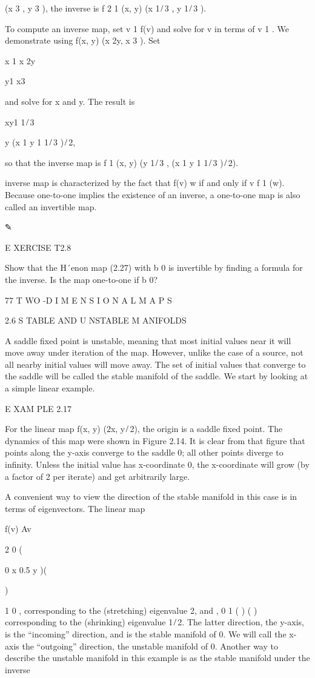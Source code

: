 \documentclass[12pt]{article}
\begin{document}
(x 3 , y 3 ), the inverse is f 2 1 (x, y)  (x 1 ̸ 3 , y 1 ̸ 3 ).

To compute an inverse map, set v 1  f(v) and solve for v in terms of v 1 . We demonstrate using f(x, y)  (x  2y, x 3 ). Set

x 1  x  2y

y1 x3 

and solve for x and y. The result is

xy1 1 ̸ 3 

y  (x 1  y 1 1 ̸ 3 ) ̸ 2,

so that the inverse map is f 1 (x, y)  (y 1 ̸ 3 , (x 1  y 1 1 ̸ 3 ) ̸ 2).

inverse map is characterized by the fact that f(v)  w if and only if v  f 1 (w). Because one-to-one implies the existence of an 
inverse, a one-to-one map is also called an invertible map.

✎

E XERCISE T2.8

Show that the H´enon map (2.27) with b  0 is invertible by ﬁnding a formula for the inverse. Is the map one-to-one if b  0?

77 T WO -D I M E N S I O N A L M A P S

2.6 S TABLE AND U NSTABLE M ANIFOLDS

A saddle ﬁxed point is unstable, meaning that most initial values near it will move away under iteration of the map. However, unlike 
the case of a source, not all nearby initial values will move away. The set of initial values that converge to the saddle will be 
called the stable manifold of the saddle. We start by looking at a simple linear example.

E XAM PLE 2.17

For the linear map f(x, y)  (2x, y ̸ 2), the origin is a saddle ﬁxed point. The dynamics of this map were shown in Figure 2.14. It is 
clear from that ﬁgure that points along the y-axis converge to the saddle 0; all other points diverge to inﬁnity. Unless the 
initial value has x-coordinate 0, the x-coordinate will grow (by a factor of 2 per iterate) and get arbitrarily large.

A convenient way to view the direction of the stable manifold in this case is in terms of eigenvectors. The linear map

f(v)  Av 

2 0 (

0 x 0.5 y )(

)

1 0 , corresponding to the (stretching) eigenvalue 2, and , 0 1 ( ) ( ) corresponding to the (shrinking) eigenvalue 1 ̸ 2. The latter 
direction, the y-axis, is the “incoming” direction, and is the stable manifold of 0. We will call the x-axis the “outgoing” 
direction, the unstable manifold of 0. Another way to describe the unstable manifold in this example is as the stable manifold under 
the inverse
\end{document}
